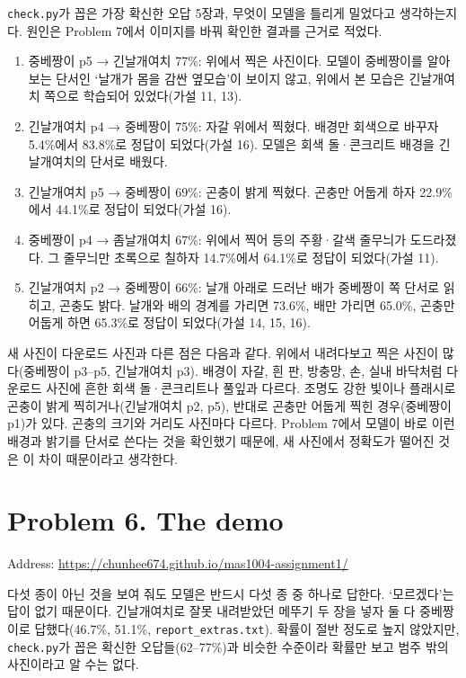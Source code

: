 \documentclass[11pt]{article}
\begin{document}
\texttt{check.py}가 꼽은 가장 확신한 오답 5장과, 무엇이 모델을 틀리게 밀었다고 생각하는지다. 원인은 Problem 7에서 이미지를 바꿔 확인한 결과를 근거로 적었다.
\begin{enumerate}
\item 중베짱이 p5 → 긴날개여치 77\%: 위에서 찍은 사진이다. 모델이 중베짱이를 알아보는 단서인 `날개가 몸을 감싼 옆모습'이 보이지 않고, 위에서 본 모습은 긴날개여치 쪽으로 학습되어 있었다(가설 11, 13).
\item 긴날개여치 p4 → 중베짱이 75\%: 자갈 위에서 찍혔다. 배경만 회색으로 바꾸자 5.4\%에서 83.8\%로 정답이 되었다(가설 16). 모델은 회색 돌·콘크리트 배경을 긴날개여치의 단서로 배웠다.
\item 긴날개여치 p5 → 중베짱이 69\%: 곤충이 밝게 찍혔다. 곤충만 어둡게 하자 22.9\%에서 44.1\%로 정답이 되었다(가설 16).
\item 중베짱이 p4 → 좀날개여치 67\%: 위에서 찍어 등의 주황·갈색 줄무늬가 도드라졌다. 그 줄무늬만 초록으로 칠하자 14.7\%에서 64.1\%로 정답이 되었다(가설 11).
\item 긴날개여치 p2 → 중베짱이 66\%: 날개 아래로 드러난 배가 중베짱이 쪽 단서로 읽히고, 곤충도 밝다. 날개와 배의 경계를 가리면 73.6\%, 배만 가리면 65.0\%, 곤충만 어둡게 하면 65.3\%로 정답이 되었다(가설 14, 15, 16).
\end{enumerate}

새 사진이 다운로드 사진과 다른 점은 다음과 같다. 위에서 내려다보고 찍은 사진이 많다(중베짱이 p3--p5, 긴날개여치 p3). 배경이 자갈, 흰 판, 방충망, 손, 실내 바닥처럼 다운로드 사진에 흔한 회색 돌·콘크리트나 풀잎과 다르다. 조명도 강한 빛이나 플래시로 곤충이 밝게 찍히거나(긴날개여치 p2, p5), 반대로 곤충만 어둡게 찍힌 경우(중베짱이 p1)가 있다. 곤충의 크기와 거리도 사진마다 다르다. Problem 7에서 모델이 바로 이런 배경과 밝기를 단서로 쓴다는 것을 확인했기 때문에, 새 사진에서 정확도가 떨어진 것은 이 차이 때문이라고 생각한다.

\section*{Problem 6. The demo}

Address: \url{https://chunhee674.github.io/mas1004-assignment1/}

다섯 종이 아닌 것을 보여 줘도 모델은 반드시 다섯 종 중 하나로 답한다. `모르겠다'는 답이 없기 때문이다. 긴날개여치로 잘못 내려받았던 메뚜기 두 장을 넣자 둘 다 중베짱이로 답했다(46.7\%, 51.1\%, \texttt{report\_extras.txt}). 확률이 절반 정도로 높지 않았지만, \texttt{check.py}가 꼽은 확신한 오답들(62--77\%)과 비슷한 수준이라 확률만 보고 범주 밖의 사진이라고 알 수는 없다.
\end{document}
